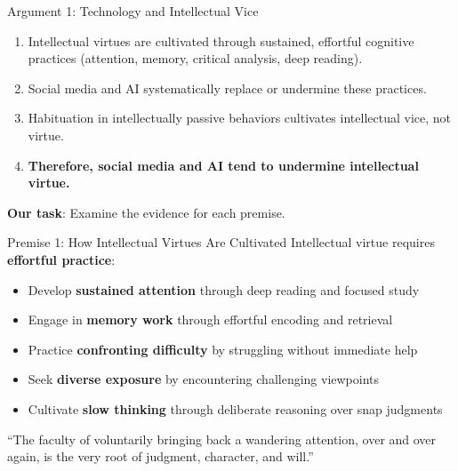 \documentclass[aspectratio=169]{beamer}
\begin{document}
\begin{frame}{Argument 1: Technology and Intellectual Vice}
\begin{argumentbox}
\begin{enumerate}
    \item Intellectual virtues are cultivated through sustained, effortful cognitive practices (attention, memory, critical analysis, deep reading).
    \item Social media and AI systematically replace or undermine these practices.
    \item Habituation in intellectually passive behaviors cultivates intellectual vice, not virtue.
    \item[\textbf{C.}] \textbf{Therefore, social media and AI tend to undermine intellectual virtue.}
\end{enumerate}
\end{argumentbox}

\vspace{0.3cm}
\textbf{Our task}: Examine the evidence for each premise.
\end{frame}

\begin{frame}{Premise 1: How Intellectual Virtues Are Cultivated}
Intellectual virtue requires \textbf{effortful practice}:

\begin{itemize}
    \item Develop \textbf{sustained attention} through deep reading and focused study
    \item Engage in \textbf{memory work} through effortful encoding and retrieval
    \item Practice \textbf{confronting difficulty} by struggling without immediate help
    \item Seek \textbf{diverse exposure} by encountering challenging viewpoints
    \item Cultivate \textbf{slow thinking} through deliberate reasoning over snap judgments
\end{itemize}

\vspace{0.3cm}
\begin{quotebox}
``The faculty of voluntarily bringing back a wandering attention, over and over again, is the very root of judgment, character, and will.''
\end{quotebox}
\end{frame}
\end{document}
